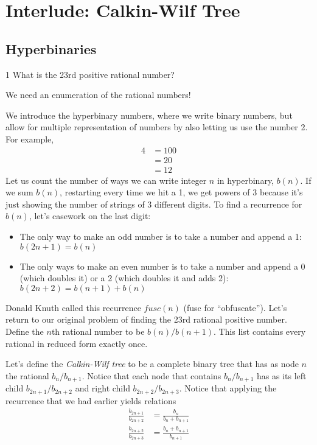 
\section{Interlude: Calkin-Wilf Tree}

\subsection{Hyperbinaries}
\begin{example}1
    What is the 23rd positive rational number?
\end{example}

\begin{solution}
    We need an enumeration of the rational numbers! 
\end{solution}

We introduce the hyperbinary numbers, where we write binary numbers, but
allow for multiple representation of numbers by also letting us use the number 2.
For example,
\begin{align*}
    4 &= 100 \\ &= 20 \\ &= 12
\end{align*}
Let us count the number of ways we can write integer $n$ in hyperbinary, $b(n)$. If
we sum $b(n)$, restarting every time we hit a 1, we get powers of 3 because it’s just
showing the number of strings of 3 different digits. To ﬁnd a recurrence for $b(n)$,
let's casework on the last digit:
\begin{itemize}
    \item The only way to make an odd number is to take a number and append a 1:
    $b(2n + 1) = b(n)$
    \item The only ways to make an even number is to take a number and append a 0
    (which doubles it) or a 2 (which doubles it and adds 2): $b(2n+2) = b(n+1)+b(n)$
\end{itemize}
Donald Knuth called this recurrence $fusc(n)$ (fusc for ``obfuscate''). Let's return to
our original problem of ﬁnding the 23rd rational positive number. Deﬁne the $n$th
rational number to be $b(n)/b(n + 1)$. This list contains every rational in reduced
form exactly once.

Let's deﬁne the \textit{Calkin-Wilf tree} to be a complete binary tree that has as node $n$ the
rational $b_n/b_{n+1}$. Notice that each node that contains $b_n/b_{n+1}$ has as its left child
$b_{2n+1}/b_{2n+2}$ and right child $b_{2n+2}/b_{2n+3}$. Notice that applying the recurrence that
we had earlier yields relations
\begin{align*}
    \frac{b_{2n+1}}{b_{2n+2}} &= \frac{b_n}{b_n + b_{n+1}}\\
    \frac{b_{2n+2}}{b_{2n+3}} &= \frac{b_n + b_{n+1}}{b_{n+1}}
\end{align*}

